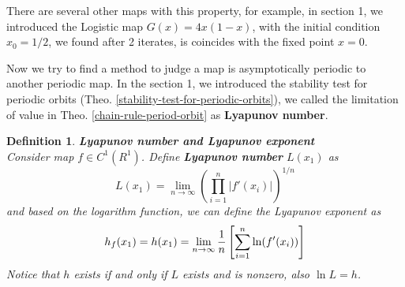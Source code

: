 \documentclass[12pt]{article}
\theoremstyle{plain}
\newtheorem{definition}{{\color{red}\textbf{Definition}}}[section]
\begin{document}
\newpage



There are several other maps with this property, for example, in section 1, we introduced the Logistic map $G(x) = 4x(1-x)$, with the initial condition $x_0 = 1/2$, we found after 2 iterates, is coincides with the fixed point $x = 0$.

Now we try to find a method to judge a map is asymptotically periodic to another periodic map. In the section 1, we introduced the stability test for periodic orbits (Theo. \ref{stability-test-for-periodic-orbits}), we called the limitation of value in Theo. \ref{chain-rule-period-orbit} as \textbf{Lyapunov number}.

\begin{definition} \textbf{Lyapunov number and Lyapunov exponent}
\\\noindent Consider map $f \in C^1(R^1)$. Define \textbf{Lyapunov number} $L(x_1)$ as 
$$
L(x_1) = \lim_{n \rightarrow \infty}(\prod_{i = 1}^{n} |f'(x_i)|)^{1/n}
$$
and based on the logarithm function, we can define the Lyapunov exponent as
$$
h_f(x_1) = h(x_1) = \lim_{n \rightarrow \infty}{1\over n}\left[\sum_{i = 1}^{n} \ln(f'(x_i))\right]
$$
Notice that $h$ exists if and only if $L$ exists and is nonzero, also $\ln L = h$. 
\end{definition} 
\end{document}
